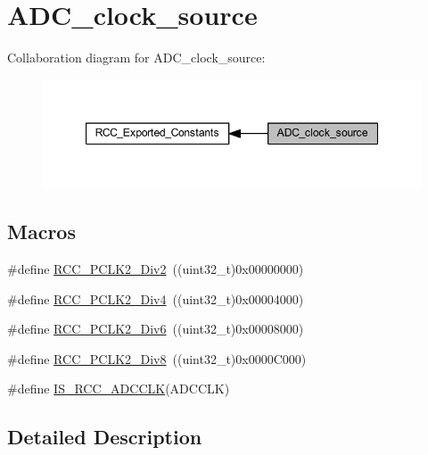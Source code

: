 \hypertarget{group___a_d_c__clock__source}{}\section{A\+D\+C\+\_\+clock\+\_\+source}
\label{group___a_d_c__clock__source}
Collaboration diagram for A\+D\+C\+\_\+clock\+\_\+source\+:
\nopagebreak
\begin{figure}[H]
\begin{center}
\leavevmode
\includegraphics[width=347pt]{group___a_d_c__clock__source}
\end{center}
\end{figure}
\subsection*{Macros}
\begin{DoxyCompactItemize}
\item 
\#define \hyperlink{group___a_d_c__clock__source_ga6c341971f2f161320ad150faa3636b41}{R\+C\+C\+\_\+\+P\+C\+L\+K2\+\_\+\+Div2}~((uint32\+\_\+t)0x00000000)
\item 
\#define \hyperlink{group___a_d_c__clock__source_gaecc7a9370fb7d7772d9c90888792084c}{R\+C\+C\+\_\+\+P\+C\+L\+K2\+\_\+\+Div4}~((uint32\+\_\+t)0x00004000)
\item 
\#define \hyperlink{group___a_d_c__clock__source_gaffb34a845f94f4ea741a45998d28deb3}{R\+C\+C\+\_\+\+P\+C\+L\+K2\+\_\+\+Div6}~((uint32\+\_\+t)0x00008000)
\item 
\#define \hyperlink{group___a_d_c__clock__source_ga77d5c803e2d31a806467bb7db9d24cd0}{R\+C\+C\+\_\+\+P\+C\+L\+K2\+\_\+\+Div8}~((uint32\+\_\+t)0x0000\+C000)
\item 
\#define \hyperlink{group___a_d_c__clock__source_ga6a9c4fb239566f0f3d44c8cc266e528b}{I\+S\+\_\+\+R\+C\+C\+\_\+\+A\+D\+C\+C\+LK}(A\+D\+C\+C\+LK)
\end{DoxyCompactItemize}


\subsection{Detailed Description}


